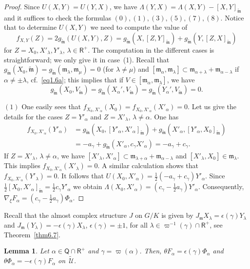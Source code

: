 \documentclass[a4paper,reqno]{amsart}
\newtheorem{lem}[thm]{Lemma}
\theoremstyle{definition}
\theoremstyle{remark}
\theoremstyle{plain}
\numberwithin{equation}{section}
\newcommand{\fm}{{\mathfrak{m}}}
\newcommand{\vpi}{\varpi}
\newcommand{\proots}{\mathsf{R}^+}
\newcommand{\rootsQ}{\mathsf{Q}}
\newcommand{\Ut}{{\widetilde{\mathcal{U}}}}
\newcommand{\wm}{{\widetilde{\mathfrak{m}}}}
\newcommand{\half}{{\frac{1}{2}}}
\begin{document}
 \begin{proof}
  Since $U(X,Y)= U(Y,X)$, we have $\Lambda(Y,X) = \Lambda(X,Y)
  - [X,Y]_\wm$ and it suffices to check the formulas $(0), (1), (3),
  (5), (7), (8)$. Notice that to determine $U(X,Y)$ we need to compute the value
  of 
$$
f_{X,Y}(Z) = 2g_\wm(U(X,Y),Z) = g_\wm(X,[Z,Y]_\wm) + g_\wm(Y,[Z,X]_\wm)
   $$
   for $Z= X_0, X'_\lambda,Y'_\lambda$, $\lambda \in \proots$.
 The computation in the different cases is straightforward; we
 only give it in case~(1). Recall that
 $g_\wm(X_0,\wm) = g_\wm(\fm_\lambda,\fm_\mu) =0$ (for
 $\lambda \ne \mu$) and
 $[\fm_\alpha,\fm_\lambda] \subset \fm_{\alpha + \lambda} +
 \fm_{\alpha -\lambda}$ if $\alpha \neq \pm \lambda$,
 cf.~\eqref{eq1.6a}; this implies that if
 $V \in [\fm_\alpha,\fm_\lambda]$, we have
 $$g_\wm(X_0,V_\wm)= g_\wm(X_\alpha',V_\wm)=
 g_\wm(Y_\alpha',V_\wm) = 0.$$


  $(1)$ One easily sees that  $f_{X_0,X'_\alpha}(X_0)=
  f_{X_0,X'_\alpha}(X'_\alpha) = 0$. Let us give the details for
  the cases $Z= Y'_\alpha$ and  $Z=X'_\lambda$, $\lambda \neq \alpha$.
  One has
\begin{align*}
f_{X_0,X'_\alpha}(Y'_\alpha) & = g_\wm(X_0,[Y'_\alpha,X'_\alpha]_\wm) +
g_\wm(X'_\alpha,[Y'_\alpha,X_0]_\wm) \\ & = -a_\gamma +
  g_\wm(X'_\alpha,c_\gamma X'_\alpha) = -a_\gamma + c_\gamma. 
\end{align*}
If $Z = X'_\lambda$, $\lambda \neq \alpha$, we have
$[X'_\lambda,X'_\alpha] \subset \fm_{\lambda + \alpha} +
\fm_{\alpha - \lambda}$ and
$[X'_\lambda,X_0] \in \fm_\lambda$. This implies
$f_{X_0,X'_\alpha}(X'_\lambda)=0$.  A similar calculation shows
that $f_{X_0,X'_\alpha}(Y'_\lambda) = 0$. It follows that
$U(X_0,X'_\alpha) = \half (-a_\gamma + c_\gamma)
Y'_\alpha$. Since
$\half [X_0,X'_\alpha]_\wm =  \half c_\gamma Y'_\alpha$ we obtain
$\Lambda(X_0,X'_\alpha) = (c_\gamma - \half
a_\gamma)Y'_\alpha$. Consequently,
$\nabla_\xi F_\alpha = (c_\gamma - \half a_\gamma) \Phi_\alpha$.
\end{proof}


Recall that the almost complex structure $J$ on $G/K$ is given by
$J_\fm X_\lambda= \epsilon(\gamma) Y_\lambda$ and
$J_\fm(Y_\lambda)= - \epsilon(\gamma)X_\lambda$,
$\epsilon(\gamma)=\pm 1$, for all
$\lambda \in \vpi^{-1}(\gamma) \cap \proots$, see
Theorem~\ref{thm6.7}.

\begin{lem}
  \label{lem4.8}
  Let 
  $\alpha \in \rootsQ \cap \proots$ and $\gamma = \vpi(\alpha)$. Then,
  $\theta F_\alpha = \epsilon(\gamma) \Phi_\alpha$ and
  $\theta \Phi_\alpha= - \epsilon(\gamma) F_\alpha$ on~$\Ut$.
\end{lem}
\end{document}
